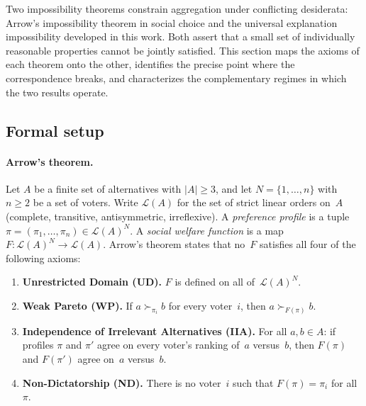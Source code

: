 

Two impossibility theorems constrain aggregation under conflicting
desiderata: Arrow's impossibility theorem in social choice
\citep{arrow1951social} and the universal explanation impossibility
developed in this work. Both assert that a small set of individually
reasonable properties cannot be jointly satisfied. This section maps
the axioms of each theorem onto the other, identifies the precise point
where the correspondence breaks, and characterizes the complementary
regimes in which the two results operate.

\subsection{Formal setup}
\label{sec:arrow-setup}

\paragraph{Arrow's theorem.}
Let $A$ be a finite set of alternatives with $|A| \geq 3$, and let
$N = \{1, \ldots, n\}$ with $n \geq 2$ be a set of voters. Write
$\mathcal{L}(A)$ for the set of strict linear orders on~$A$ (complete,
transitive, antisymmetric, irreflexive). A \emph{preference profile}
is a tuple $\pi = (\pi_1, \ldots, \pi_n) \in \mathcal{L}(A)^N$.
A \emph{social welfare function} is a map
$F : \mathcal{L}(A)^N \to \mathcal{L}(A)$. Arrow's theorem states
that no~$F$ satisfies all four of the following axioms:
\begin{enumerate}[label=\textbf{A\arabic*.},leftmargin=2.5em]
  \item \textbf{Unrestricted Domain (UD).}\; $F$ is defined on all
    of~$\mathcal{L}(A)^N$.
  \item \textbf{Weak Pareto (WP).}\; If $a \succ_{\pi_i} b$ for every
    voter~$i$, then $a \succ_{F(\pi)} b$.
  \item \textbf{Independence of Irrelevant Alternatives (IIA).}\;
    For all $a, b \in A$: if profiles $\pi$ and $\pi'$ agree on every
    voter's ranking of~$a$ versus~$b$, then $F(\pi)$ and $F(\pi')$
    agree on~$a$ versus~$b$.
  \item \textbf{Non-Dictatorship (ND).}\; There is no voter~$i$ such
    that $F(\pi) = \pi_i$ for all~$\pi$.
\end{enumerate}


